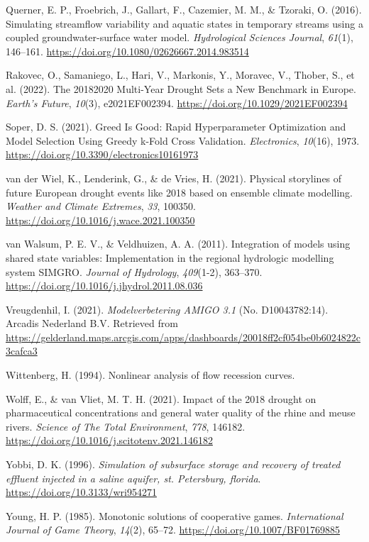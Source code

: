 \documentclass[
]{agujournal2019}
\newlength{\cslhangindent}
\newenvironment{CSLReferences}[2] %
 {\begin{list}{}{%
  \setlength{\itemindent}{0pt}
  \setlength{\leftmargin}{0pt}
  \setlength{\parsep}{0pt}
  \ifodd #1
   \setlength{\leftmargin}{\cslhangindent}
   \setlength{\itemindent}{-1\cslhangindent}
  \fi
  \setlength{\itemsep}{#2\baselineskip}}}
 {\end{list}}
\begin{document}
\begin{CSLReferences}{1}{0}
Querner, E. P., Froebrich, J., Gallart, F., Cazemier, M. M., \& Tzoraki,
O. (2016). Simulating streamflow variability and aquatic states in
temporary streams using a coupled groundwater-surface water model.
\emph{Hydrological Sciences Journal}, \emph{61}(1), 146--161.
\url{https://doi.org/10.1080/02626667.2014.983514}

Rakovec, O., Samaniego, L., Hari, V., Markonis, Y., Moravec, V., Thober,
S., et al. (2022). The 2018{\textendash}2020 Multi-Year Drought Sets a
New Benchmark in Europe. \emph{Earth's Future}, \emph{10}(3),
e2021EF002394. \url{https://doi.org/10.1029/2021EF002394}

Soper, D. S. (2021). Greed Is Good: Rapid Hyperparameter Optimization
and Model Selection Using Greedy k-Fold Cross Validation.
\emph{Electronics}, \emph{10}(16), 1973.
\url{https://doi.org/10.3390/electronics10161973}

van der Wiel, K., Lenderink, G., \& de Vries, H. (2021). Physical
storylines of future European drought events like 2018 based on ensemble
climate modelling. \emph{Weather and Climate Extremes}, \emph{33},
100350. \url{https://doi.org/10.1016/j.wace.2021.100350}

van Walsum, P. E. V., \& Veldhuizen, A. A. (2011). Integration of models
using shared state variables: Implementation in the regional hydrologic
modelling system SIMGRO. \emph{Journal of Hydrology}, \emph{409}(1-2),
363--370. \url{https://doi.org/10.1016/j.jhydrol.2011.08.036}

Vreugdenhil, I. (2021). \emph{Modelverbetering {AMIGO} 3.1} (No.
D10043782:14). Arcadis Nederland B.V. Retrieved from
\url{https://gelderland.maps.arcgis.com/apps/dashboards/20018ff2cf054be0b6024822c3cafca3}

Wittenberg, H. (1994). Nonlinear analysis of flow recession curves.

Wolff, E., \& van Vliet, M. T. H. (2021). Impact of the 2018 drought on
pharmaceutical concentrations and general water quality of the rhine and
meuse rivers. \emph{Science of The Total Environment}, \emph{778},
146182. \url{https://doi.org/10.1016/j.scitotenv.2021.146182}

Yobbi, D. K. (1996). \emph{Simulation of subsurface storage and recovery
of treated effluent injected in a saline aquifer, st. Petersburg,
florida}. \url{https://doi.org/10.3133/wri954271}

Young, H. P. (1985). Monotonic solutions of cooperative games.
\emph{International Journal of Game Theory}, \emph{14}(2), 65--72.
\url{https://doi.org/10.1007/BF01769885}

\end{CSLReferences}
\end{document}
